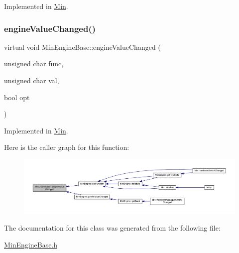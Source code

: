Implemented in \hyperlink{class_min_a4b150119664bd46bd2a80561862ff666}{Min}.

\mbox{\label{class_min_engine_base_a35b19eb25b2bbfbcf0bc2262a63ec488}} 
\subsubsection{\texorpdfstring{engine\+Value\+Changed()}{engineValueChanged()}}
{\footnotesize\ttfamily virtual void Min\+Engine\+Base\+::engine\+Value\+Changed (\begin{DoxyParamCaption}\item[{unsigned char}]{func,  }\item[{unsigned char}]{val,  }\item[{bool}]{opt }\end{DoxyParamCaption})\hspace{0.3cm}{\ttfamily [pure virtual]}}



Implemented in \hyperlink{class_min_a9fe42a8d40c06d73556cf6d0dac2dc71}{Min}.

Here is the caller graph for this function\+:
\nopagebreak
\begin{figure}[H]
\begin{center}
\leavevmode
\includegraphics[width=350pt]{class_min_engine_base_a35b19eb25b2bbfbcf0bc2262a63ec488_icgraph}
\end{center}
\end{figure}


The documentation for this class was generated from the following file\+:\begin{DoxyCompactItemize}
\item 
\hyperlink{_min_engine_base_8h}{Min\+Engine\+Base.\+h}\end{DoxyCompactItemize}
